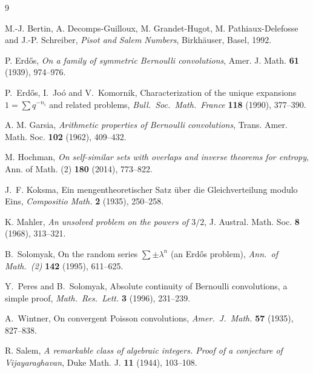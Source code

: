 \documentclass[11pt,reqno]{amsart}
\theoremstyle{plain}
\theoremstyle{definition}
\theoremstyle{remark}
\begin{document}
\begin{thebibliography}{9}

M.-J. Bertin, A. Decomps-Guilloux, M. Grandet-Hugot, M. Pathiaux-Delefosse and
J.-P. Schreiber,
\emph{Pisot and Salem Numbers},
Birkh\"auser, Basel, 1992.

P. Erd\H{o}s,
\emph{On a family of symmetric Bernoulli convolutions},
Amer. J. Math. \textbf{61} (1939), 974--976.

P.~Erd\H{o}s, I.~Jo\'o and V.~Komornik,
\newblock Characterization of the unique expansions
$1=\sum q^{-n_i}$ and related problems,
\newblock \emph{Bull.\ Soc.\ Math.\ France} \textbf{118} (1990), 377--390.

A. M. Garsia,
\emph{Arithmetic properties of Bernoulli convolutions},
Trans. Amer. Math. Soc. \textbf{102} (1962), 409--432.

M. Hochman,
\emph{On self-similar sets with overlaps and inverse theorems for entropy},
Ann. of Math. (2) \textbf{180} (2014), 773--822.

J.~F. Koksma,
\newblock Ein mengentheoretischer Satz \"uber die Gleichverteilung modulo Eins,
\newblock \emph{Compositio Math.} \textbf{2} (1935), 250--258.

K. Mahler,
\emph{An unsolved problem on the powers of $3/2$},
J. Austral. Math. Soc. \textbf{8} (1968), 313--321.

B.~Solomyak,
\newblock On the random series $\sum\pm\lambda^n$ (an Erd\H{o}s problem),
\newblock \emph{Ann.\ of Math.\ (2)} \textbf{142} (1995), 611--625.

Y.~Peres and B.~Solomyak,
\newblock Absolute continuity of Bernoulli convolutions, a simple proof,
\newblock \emph{Math.\ Res.\ Lett.} \textbf{3} (1996), 231--239.

A.~Wintner,
\newblock On convergent Poisson convolutions,
\newblock \emph{Amer.\ J.\ Math.} \textbf{57} (1935), 827--838.

R. Salem,
\emph{A remarkable class of algebraic integers. Proof of a conjecture of
Vijayaraghavan},
Duke Math. J. \textbf{11} (1944), 103--108.

\end{thebibliography}
\end{document}
